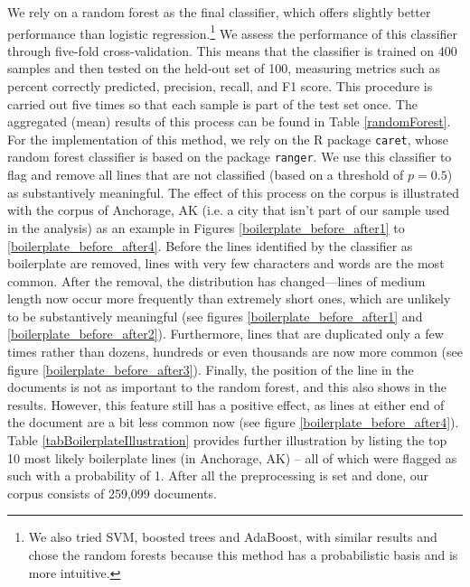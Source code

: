 \documentclass[11pt]{article}
\begin{document}

%

%

We rely on a random forest as the final classifier, which offers slightly better performance than logistic regression.\footnote{We also tried SVM, boosted trees and AdaBoost, with similar results and chose the random forests because this method has a probabilistic basis and is more intuitive.} We assess the performance of this classifier through five-fold cross-validation. This means that the classifier is trained on 400 samples and then tested on the held-out set of 100, measuring metrics such as percent correctly predicted, precision, recall, and F1 score. This procedure is carried out five times so that each sample is part of the test set once. The aggregated (mean) results of this process can be found in Table \ref{randomForest}. For the implementation of this method, we rely on the R package \texttt{caret}, whose random forest classifier is based on the package \texttt{ranger}. We use this classifier to flag and remove all lines that are not classified (based on a threshold of $p = 0.5$) as substantively meaningful. The effect of this process on the corpus is illustrated with the corpus of Anchorage, AK (i.e. a city that isn't part of our sample used in the analysis) as an example in Figures \ref{boilerplate_before_after1} to \ref{boilerplate_before_after4}. Before the lines identified by the classifier as boilerplate are removed, lines with very few characters and words are the most common. After the removal, the distribution has changed---lines of medium length now occur more frequently than extremely short ones, which are unlikely to be substantively meaningful (see figures \ref{boilerplate_before_after1} and \ref{boilerplate_before_after2}). Furthermore, lines that are duplicated only a few times rather than dozens, hundreds or even thousands are now more common (see figure \ref{boilerplate_before_after3}). Finally, the position of the line in the documents is not as important to the random forest, and this also shows in the results. However, this feature still has a positive effect, as lines at either end of the document are a bit less common now (see figure \ref{boilerplate_before_after4}). Table \ref{tabBoilerplateIllustration} provides further illustration by listing the top 10 most likely boilerplate lines (in Anchorage, AK) -- all of which were flagged as such with a probability of 1. After all the preprocessing is set and done, our corpus consists of 259,099 documents.
\end{document}
